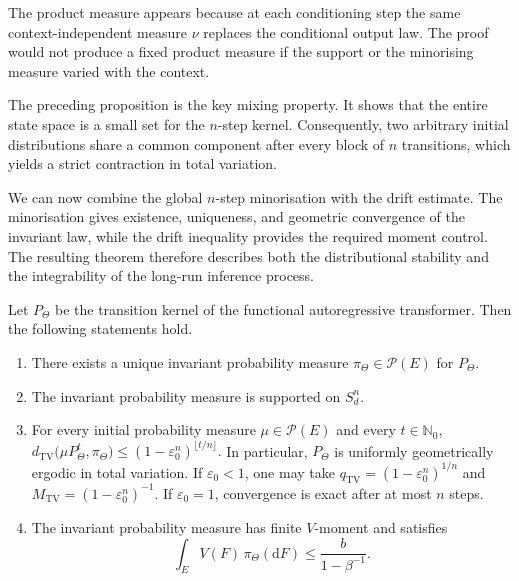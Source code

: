 The product measure appears because at each conditioning step the same context-independent measure \(\nu\) replaces the conditional output law. The proof would not produce a fixed product measure if the support or the minorising measure varied with the context.

The preceding proposition is the key mixing property. It shows that the entire state space is a small set for the \(n\)-step kernel. Consequently, two arbitrary initial distributions share a common component after every block of \(n\) transitions, which yields a strict contraction in total variation.

We can now combine the global \(n\)-step minorisation with the drift estimate. The minorisation gives existence, uniqueness, and geometric convergence of the invariant law, while the drift inequality provides the required moment control. The resulting theorem therefore describes both the distributional stability and the integrability of the long-run inference process.

\begin{theorem}\label{thm:Uniform geometric ergodicity}
Let \(P_\Theta\) be the transition kernel of the functional autoregressive transformer. Then the following statements hold.

\begin{enumerate}
    \item There exists a unique invariant probability measure \(\pi_\Theta\in\mathcal P(E)\) for \(P_\Theta\).

    \item The invariant probability measure is supported on \(S_d^n\).

    \item For every initial probability measure \(\mu\in\mathcal P(E)\) and every \(t\in\mathbb N_0\),
    \(
    d_{\mathrm{TV}}\bigl(\mu P_\Theta^t,\pi_\Theta\bigr)
    \leqslant
    (1-\varepsilon_0^n)^{\lfloor t/n\rfloor}.
    \)
    In particular, \(P_\Theta\) is uniformly geometrically ergodic in total variation. If \(\varepsilon_0<1\), one may take \(q_{\mathrm{TV}}=(1-\varepsilon_0^n)^{1/n}\) and \(M_{\mathrm{TV}}=(1-\varepsilon_0^n)^{-1}\). If \(\varepsilon_0=1\), convergence is exact after at most \(n\) steps.

    \item The invariant probability measure has finite \(V\)-moment and satisfies
    \[
    \int_E V(F)\,\pi_\Theta(\mathrm dF)
    \leqslant
    \frac{b}{1-\beta^{-1}}.
    \]
\end{enumerate}
\end{theorem}

